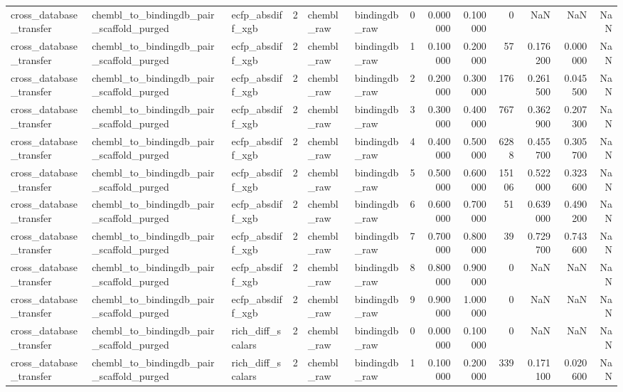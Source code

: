 \begin{longtable}{lllrllrrrrrrr}
cross\_database\_transfer & chembl\_to\_bindingdb\_pair\_scaffold\_purged & ecfp\_absdiff\_xgb & 2 & chembl\_raw & bindingdb\_raw & 0 & 0.000000 & 0.100000 & 0 & NaN & NaN & NaN \\
cross\_database\_transfer & chembl\_to\_bindingdb\_pair\_scaffold\_purged & ecfp\_absdiff\_xgb & 2 & chembl\_raw & bindingdb\_raw & 1 & 0.100000 & 0.200000 & 57 & 0.176200 & 0.000000 & NaN \\
cross\_database\_transfer & chembl\_to\_bindingdb\_pair\_scaffold\_purged & ecfp\_absdiff\_xgb & 2 & chembl\_raw & bindingdb\_raw & 2 & 0.200000 & 0.300000 & 176 & 0.261500 & 0.045500 & NaN \\
cross\_database\_transfer & chembl\_to\_bindingdb\_pair\_scaffold\_purged & ecfp\_absdiff\_xgb & 2 & chembl\_raw & bindingdb\_raw & 3 & 0.300000 & 0.400000 & 767 & 0.362900 & 0.207300 & NaN \\
cross\_database\_transfer & chembl\_to\_bindingdb\_pair\_scaffold\_purged & ecfp\_absdiff\_xgb & 2 & chembl\_raw & bindingdb\_raw & 4 & 0.400000 & 0.500000 & 6288 & 0.455700 & 0.305700 & NaN \\
cross\_database\_transfer & chembl\_to\_bindingdb\_pair\_scaffold\_purged & ecfp\_absdiff\_xgb & 2 & chembl\_raw & bindingdb\_raw & 5 & 0.500000 & 0.600000 & 15106 & 0.522000 & 0.323600 & NaN \\
cross\_database\_transfer & chembl\_to\_bindingdb\_pair\_scaffold\_purged & ecfp\_absdiff\_xgb & 2 & chembl\_raw & bindingdb\_raw & 6 & 0.600000 & 0.700000 & 51 & 0.639000 & 0.490200 & NaN \\
cross\_database\_transfer & chembl\_to\_bindingdb\_pair\_scaffold\_purged & ecfp\_absdiff\_xgb & 2 & chembl\_raw & bindingdb\_raw & 7 & 0.700000 & 0.800000 & 39 & 0.729700 & 0.743600 & NaN \\
cross\_database\_transfer & chembl\_to\_bindingdb\_pair\_scaffold\_purged & ecfp\_absdiff\_xgb & 2 & chembl\_raw & bindingdb\_raw & 8 & 0.800000 & 0.900000 & 0 & NaN & NaN & NaN \\
cross\_database\_transfer & chembl\_to\_bindingdb\_pair\_scaffold\_purged & ecfp\_absdiff\_xgb & 2 & chembl\_raw & bindingdb\_raw & 9 & 0.900000 & 1.000000 & 0 & NaN & NaN & NaN \\
cross\_database\_transfer & chembl\_to\_bindingdb\_pair\_scaffold\_purged & rich\_diff\_scalars & 2 & chembl\_raw & bindingdb\_raw & 0 & 0.000000 & 0.100000 & 0 & NaN & NaN & NaN \\
cross\_database\_transfer & chembl\_to\_bindingdb\_pair\_scaffold\_purged & rich\_diff\_scalars & 2 & chembl\_raw & bindingdb\_raw & 1 & 0.100000 & 0.200000 & 339 & 0.171100 & 0.020600 & NaN \\

\end{longtable}
